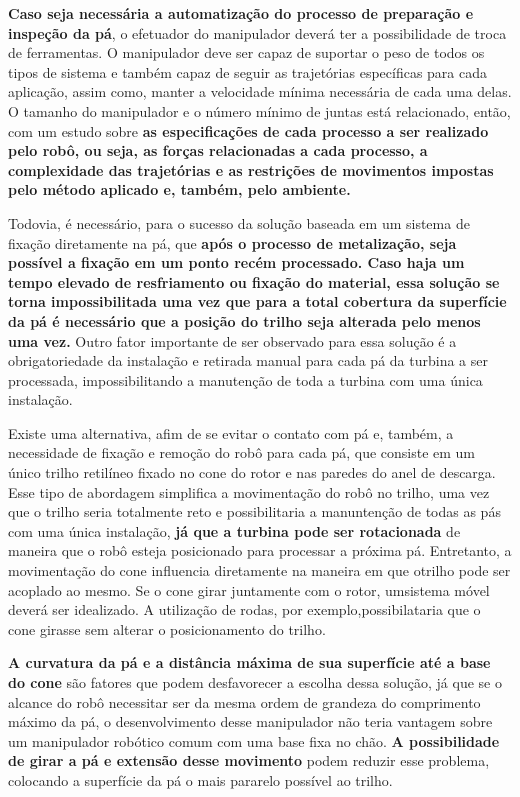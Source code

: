 \textbf{Caso seja necessária a automatização do processo de preparação e
inspeção da pá}, o efetuador do manipulador deverá ter a possibilidade de troca 
de ferramentas. O manipulador deve ser capaz de suportar o peso de todos os
tipos de sistema e também capaz de seguir as trajetórias específicas para cada
aplicação, assim como, manter a velocidade mínima necessária de cada uma delas.
O tamanho do manipulador e o número mínimo de juntas está relacionado, então,
com um estudo sobre \textbf{as especificações de cada processo a ser realizado
pelo robô, ou seja, as forças relacionadas a cada processo, a complexidade das
trajetórias e as restrições de movimentos impostas pelo método aplicado e,
também, pelo ambiente.}

Todovia, é necessário, para o sucesso da solução baseada em um sistema de
fixação diretamente na pá, que \textbf{após o processo de metalização, seja 
possível a fixação em um ponto recém processado. Caso haja um tempo elevado de 
resfriamento ou fixação do material,
essa solução se torna impossibilitada uma vez que para a total cobertura da 
superfície da pá é necessário que a posição do trilho seja alterada pelo menos 
uma vez.} Outro fator importante de ser observado para essa solução é a
obrigatoriedade da instalação e retirada manual para cada pá da turbina a ser
processada, impossibilitando a manutenção de toda a turbina com uma única
instalação.

Existe uma alternativa, afim de se evitar o contato com pá e, também, a
necessidade de fixação e remoção do robô para cada pá, que consiste em um único trilho
retilíneo fixado no cone do rotor e nas paredes do anel de descarga. Esse tipo
de abordagem simplifica a movimentação do robô no trilho, uma vez que o trilho
seria totalmente reto e possibilitaria a manuntenção de todas as pás com uma
única instalação, \textbf{já que a turbina pode ser rotacionada} de maneira que o robô
esteja posicionado para processar a próxima pá. Entretanto, a movimentação do 
cone influencia diretamente na maneira em que otrilho pode ser acoplado ao 
mesmo. Se o cone girar juntamente com o rotor, umsistema móvel deverá ser 
idealizado. A utilização de rodas, por exemplo,possibilataria que o cone 
girasse sem alterar o posicionamento do trilho. 

\textbf{A curvatura da pá e a distância máxima de sua superfície até a base do
cone} são fatores que podem desfavorecer a escolha dessa solução, já que se o
alcance do robô necessitar ser da mesma ordem de grandeza do comprimento máximo
da pá, o desenvolvimento desse manipulador não teria vantagem sobre um
manipulador robótico comum com uma base fixa no chão. \textbf{A possibilidade
de girar a pá e extensão desse movimento} podem reduzir esse problema, colocando
a superfície da pá o mais pararelo possível ao trilho.

